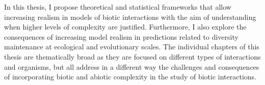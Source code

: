 \begin{refsection}

In this thesis, I propose theoretical and statistical frameworks that allow increasing realism in models of biotic interactions with the aim of understanding when higher levels of complexity are justified. Furthermore, I also explore the consequences of increasing model realism in predictions related to diversity maintenance at ecological and evolutionary scales. The individual chapters of this thesis are thematically broad as they are focused on different types of interactions and organisms, but all address in a different way the challenges and consequences of incorporating biotic and abiotic complexity in the study of biotic interactions.
\printbibliography
\end{refsection}
